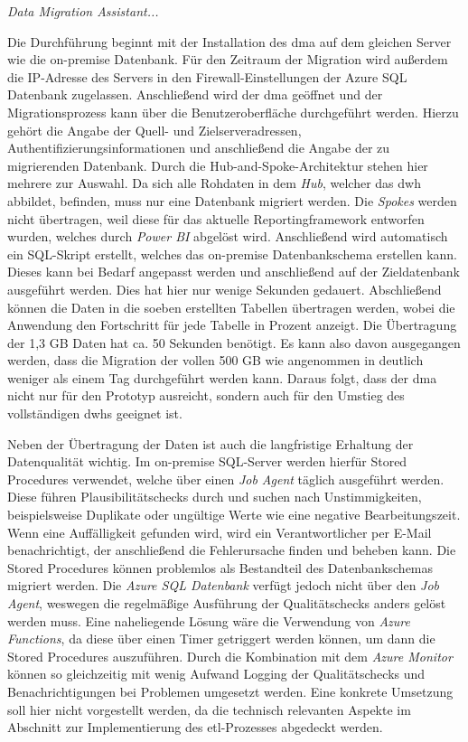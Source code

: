 \textit{Data Migration Assistant...}

Die Durchführung beginnt mit der Installation des \ac{dma} auf dem gleichen Server wie die on-premise Datenbank. Für den Zeitraum der Migration wird außerdem die IP-Adresse des Servers in den Firewall-Einstellungen der Azure SQL Datenbank zugelassen. Anschließend wird der \ac{dma} geöffnet und der Migrationsprozess kann über die Benutzeroberfläche durchgeführt werden. Hierzu gehört die Angabe der Quell- und Zielserveradressen, Authentifizierungsinformationen und anschließend die Angabe der zu migrierenden Datenbank. Durch die Hub-and-Spoke-Architektur stehen hier mehrere zur Auswahl. Da sich alle Rohdaten in dem \textit{Hub}, welcher das \ac{dwh} abbildet, befinden, muss nur eine Datenbank migriert werden. Die \textit{Spokes} werden nicht übertragen, weil diese für das aktuelle Reportingframework entworfen wurden, welches durch \textit{Power BI} abgelöst wird. Anschließend wird automatisch ein SQL-Skript erstellt, welches das on-premise Datenbankschema erstellen kann. Dieses kann bei Bedarf angepasst werden und anschließend auf der Zieldatenbank ausgeführt werden. Dies hat hier nur wenige Sekunden gedauert. Abschließend können die Daten in die soeben erstellten Tabellen übertragen werden, wobei die Anwendung den Fortschritt für jede Tabelle in Prozent anzeigt. Die Übertragung der 1,3 GB Daten hat ca. 50 Sekunden benötigt. Es kann also davon ausgegangen werden, dass die Migration der vollen 500 GB wie angenommen in deutlich weniger als einem Tag durchgeführt werden kann. Daraus folgt, dass der \ac{dma} nicht nur für den Prototyp ausreicht, sondern auch für den Umstieg des vollständigen \acp{dwh} geeignet ist.

Neben der Übertragung der Daten ist auch die langfristige Erhaltung der Datenqualität wichtig. Im on-premise SQL-Server werden hierfür Stored Procedures verwendet, welche über einen \textit{Job Agent} täglich ausgeführt werden. Diese führen Plausibilitätschecks durch und suchen nach Unstimmigkeiten, beispielsweise Duplikate oder ungültige Werte wie eine negative Bearbeitungszeit. Wenn eine Auffälligkeit gefunden wird, wird ein Verantwortlicher per E-Mail benachrichtigt, der anschließend die Fehlerursache finden und beheben kann. Die Stored Procedures können problemlos als Bestandteil des Datenbankschemas migriert werden. Die \textit{Azure SQL Datenbank} verfügt jedoch nicht über den \textit{Job Agent}, weswegen die regelmäßige Ausführung der Qualitätschecks anders gelöst werden muss. Eine naheliegende Lösung wäre die Verwendung von \textit{Azure Functions}, da diese über einen Timer getriggert werden können, um dann die Stored Procedures auszuführen. Durch die Kombination mit dem \textit{Azure Monitor} können so gleichzeitig mit wenig Aufwand Logging der Qualitätschecks und Benachrichtigungen bei Problemen umgesetzt werden. Eine konkrete Umsetzung soll hier nicht vorgestellt werden, da die technisch relevanten Aspekte im Abschnitt zur Implementierung des \ac{etl}-Prozesses abgedeckt werden.

